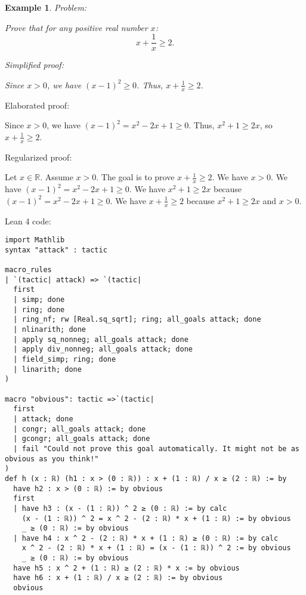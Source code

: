 \documentclass{article}
\newtheorem{example}{Example}
\begin{document}
\begin{example}
Problem:
\begin{tcolorbox}[colback=yellow!10, width=\linewidth]
Prove that for any positive real number $x$:
    $$x + \frac{1}{x} \geq 2.$$
\end{tcolorbox}

Simplified proof:
\begin{tcolorbox}[colback=blue!10, width=\linewidth]
Since $x>0$, we have $(x-1)^2 \ge 0$. Thus, $x + \frac{1}{x} \ge 2$.
\end{tcolorbox}
\end{example}

Elaborated proof:
\begin{tcolorbox}[colback=green!10, width=\linewidth]
Since $x>0$, we have $(x-1)^2 = x^2 - 2x + 1 \ge 0$. Thus, $x^2 + 1 \ge 2x$, so $x + \frac{1}{x} \ge 2$.
\end{tcolorbox}

Regularized proof:
\begin{tcolorbox}[colback=red!10, width=\linewidth]
Let $x\in\mathbb{R}$.
Assume $x>0$.
The goal is to prove $x + \frac{1}{x} \ge 2$.
We have $x>0$.
We have ${(x-1)}^2 = x^2 - 2x + 1 \ge 0$.
We have $x^2 + 1 \ge 2x$ because ${(x-1)}^2 = x^2 - 2x + 1 \ge 0$.
We have $x + \frac{1}{x} \ge 2$ because $x^2 + 1 \ge 2x$ and $x>0$.
\end{tcolorbox}

Lean 4 code:
\begin{tcolorbox}[colback=white!10, width=\linewidth]
\begin{lstlisting}[language=Lean4]
import Mathlib
syntax "attack" : tactic

macro_rules
| `(tactic| attack) => `(tactic|
  first
  | simp; done
  | ring; done
  | ring_nf; rw [Real.sq_sqrt]; ring; all_goals attack; done
  | nlinarith; done
  | apply sq_nonneg; all_goals attack; done
  | apply div_nonneg; all_goals attack; done
  | field_simp; ring; done
  | linarith; done
)

macro "obvious": tactic =>`(tactic|
  first
  | attack; done
  | congr; all_goals attack; done
  | gcongr; all_goals attack; done
  | fail "Could not prove this goal automatically. It might not be as obvious as you think!"
)
def h (x : ℝ) (h1 : x > (0 : ℝ)) : x + (1 : ℝ) / x ≥ (2 : ℝ) := by
  have h2 : x > (0 : ℝ) := by obvious
  first
  | have h3 : (x - (1 : ℝ)) ^ 2 ≥ (0 : ℝ) := by calc
    (x - (1 : ℝ)) ^ 2 = x ^ 2 - (2 : ℝ) * x + (1 : ℝ) := by obvious
    _ ≥ (0 : ℝ) := by obvious
  | have h4 : x ^ 2 - (2 : ℝ) * x + (1 : ℝ) ≥ (0 : ℝ) := by calc
    x ^ 2 - (2 : ℝ) * x + (1 : ℝ) = (x - (1 : ℝ)) ^ 2 := by obvious
    _ ≥ (0 : ℝ) := by obvious
  have h5 : x ^ 2 + (1 : ℝ) ≥ (2 : ℝ) * x := by obvious
  have h6 : x + (1 : ℝ) / x ≥ (2 : ℝ) := by obvious
  obvious

\end{lstlisting}
\end{tcolorbox}
\end{document}
